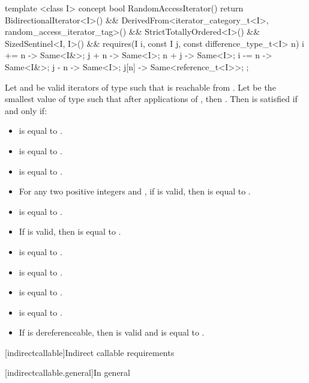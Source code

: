 %
\begin{codeblock}
  template <class I>
  concept bool RandomAccessIterator() {
    return BidirectionalIterator<I>() &&
      DerivedFrom<iterator_category_t<I>, random_access_iterator_tag>() &&
      StrictTotallyOrdered<I>() &&
      SizedSentinel<I, I>() &&
      requires(I i, const I j, const difference_type_t<I> n) {
        { i += n } -> Same<I&>;
        { j + n } -> Same<I>;
        { n + j } -> Same<I>;
        { i -= n } -> Same<I&>;
        { j - n } -> Same<I>;
        { j[n] } -> Same<reference_t<I>>;
      };
  }
\end{codeblock}

\pnum
Let  and  be valid iterators of type  such that  is reachable
from . Let  be the smallest value of type
 such that after
 applications of , then . Then
 is satisfied if and only if:

\begin{itemize}
\item {} is equal to .
\item {} is equal to .
\item {} is equal to .
\item For any two positive integers  and , if  is valid, then
 is equal to .
\item {} is equal to .
\item If  is valid, then  is equal to .
\item {} is equal to .
\item {} is equal to .
\item {} is equal to .
\item {} is equal to .
\item If  is dereferenceable, then  is valid and is equal to .
\end{itemize}

[indirectcallable]{Indirect callable requirements}

[indirectcallable.general]{In general}

